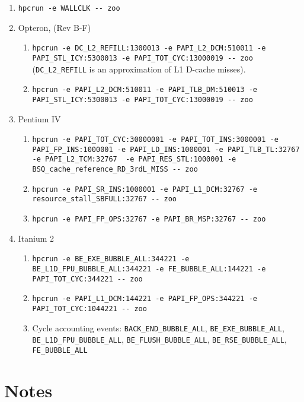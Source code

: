 \documentclass[english]{article}
\begin{document}
\begin{enumerate}
\item \verb+hpcrun -e WALLCLK -- zoo+
\item Opteron, (Rev B-F)
  \begin{enumerate}
    \item \verb+hpcrun -e DC_L2_REFILL:1300013 -e PAPI_L2_DCM:510011 -e PAPI_STL_ICY:5300013 -e PAPI_TOT_CYC:13000019 -- zoo+ (\verb+DC_L2_REFILL+ is an approximation of L1 D-cache misses).
    \item \verb+hpcrun -e PAPI_L2_DCM:510011 -e PAPI_TLB_DM:510013 -e PAPI_STL_ICY:5300013 -e PAPI_TOT_CYC:13000019 -- zoo+
  \end{enumerate}

\item Pentium IV 
  \begin{enumerate}
    \item \verb+hpcrun -e PAPI_TOT_CYC:30000001 -e PAPI_TOT_INS:3000001 -e PAPI_FP_INS:1000001 -e PAPI_LD_INS:1000001 -e PAPI_TLB_TL:32767  -e PAPI_L2_TCM:32767  -e PAPI_RES_STL:1000001 -e BSQ_cache_reference_RD_3rdL_MISS -- zoo+
    \item \verb+hpcrun -e PAPI_SR_INS:1000001 -e PAPI_L1_DCM:32767 -e resource_stall_SBFULL:32767 -- zoo+
    \item \verb+hpcrun -e PAPI_FP_OPS:32767 -e PAPI_BR_MSP:32767 -- zoo+
  \end{enumerate}

\item Itanium 2
  \begin{enumerate}
    \item \verb+hpcrun -e BE_EXE_BUBBLE_ALL:344221 -e BE_L1D_FPU_BUBBLE_ALL:344221 -e FE_BUBBLE_ALL:144221 -e PAPI_TOT_CYC:344221 -- zoo+
    \item \verb+hpcrun -e PAPI_L1_DCM:144221 -e PAPI_FP_OPS:344221 -e PAPI_TOT_CYC:1044221 -- zoo+
    \item Cycle accounting events: \verb+BACK_END_BUBBLE_ALL+, \verb+BE_EXE_BUBBLE_ALL+, \verb+BE_L1D_FPU_BUBBLE_ALL+, \verb+BE_FLUSH_BUBBLE_ALL+, \verb+BE_RSE_BUBBLE_ALL+, \verb+FE_BUBBLE_ALL+
  \end{enumerate}

\end{enumerate}

\section{Notes}
\end{document}
